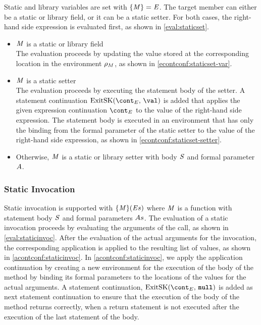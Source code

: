 \documentclass[a4paper,oneside,fleqn]{article}
\newcommand{\synt}[1]{\ensuremath{\text{\textbf{\texttt{#1}}}}}
\DeclareMathOperator{\nnull}{\synt{null}}
\begin{document}
Static and library variables are set with $\{\mathit{M}\}=\mathit{E}$.
The target member can either be a static or library field, or it can be a static setter. For both cases, the right-hand side expression is evaluated first, as shown in \eqref{eval:staticset}.

\begin{itemize}
    \item $\mathit{M}$ is a static or library field\\
        The evaluation proceeds by updating the value stored at the corresponding location in the environment $\rho_{M}$, as shown in \eqref{econtconf:staticset-var}.

    \item $\mathit{M}$ is a static setter\\
        The evaluation proceeds by executing the statement body of the setter.
        A statement continuation $\ExitSK{\val}$ is added that applies the given expression continuation $\econt$ to the value of the right-hand side expression.
        The statement body is executed in an environment that has only the binding from the formal parameter of the static setter to the value of the right-hand side expression, as shown in \eqref{econtconf:staticset-setter}.

    \item Otherwise, $\mathit{M}$ is a static or library setter with body $\mathit{S}$ and formal parameter $A$.

\end{itemize}


\subsubsection{Static Invocation}
\label{subsubsec:static-invoc}

Static invocation is supported with $\{\mathit{M}\}(\mathit{E}{s})$ where $\mathit{M}$ is a function with statement body $\mathit{S}$ and formal parameters $As$.
The evaluation of a static invocation proceeds by evaluating the arguments of the call, as shown in \eqref{eval:staticinvoc}.
After the evaluation of the actual arguments for the invocation, the corresponding application is applied to the resulting list of values, as shown in \eqref{acontconf:staticinvoc}.
In \eqref{acontconf:staticinvoc}, we apply the application continuation by creating a new environment for the execution of the body of the method by binding its formal parameters to the locations of the values for the actual arguments.
A statement continuation, $\ExitSK{\nnull}$ is added as next statement continuation to ensure that the execution of the body of the method returns correctly, when a return statement is not executed after the execution of the last statement of the body.
\end{document}
